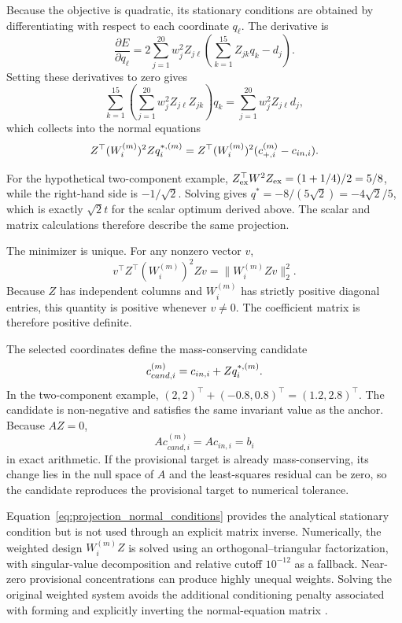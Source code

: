 Because the objective is quadratic, its stationary conditions are obtained by differentiating with respect to each coordinate $q_\ell$. The derivative is
\[
\frac{\partial E}{\partial q_\ell}
=2\sum_{j=1}^{20}w_j^2 Z_{j\ell}
\left(\sum_{k=1}^{15}Z_{jk}q_k-d_j\right).
\]
Setting these derivatives to zero gives
\[
\sum_{k=1}^{15}\left(\sum_{j=1}^{20}w_j^2Z_{j\ell}Z_{jk}\right)q_k
=\sum_{j=1}^{20}w_j^2Z_{j\ell}d_j,
\]
which collects into the normal equations
\begin{equation}
\equationname{Normal equations for weighted projection coordinates}
Z^\top(W_i^{(m)})^2Zq_i^{*,(m)}
=Z^\top(W_i^{(m)})^2(c_{+,i}^{(m)}-c_{in,i}).
\label{eq:projection_normal_conditions}
\end{equation}

For the hypothetical two-component example,
$Z_{\rm ex}^\top W^2Z_{\rm ex}=(1+1/4)/2=5/8$,
while the right-hand side is $-1/\sqrt2$. Solving gives
$q^*=-8/(5\sqrt2)=-4\sqrt2/5$, which is exactly $\sqrt2t$ for the scalar optimum derived above. The scalar and matrix calculations therefore describe the same projection.

The minimizer is unique. For any nonzero vector $v$,
\[
v^\top Z^\top(W_i^{(m)})^2Zv
=
\|W_i^{(m)}Zv\|_2^2.
\]
Because $Z$ has independent columns and $W_i^{(m)}$ has strictly positive diagonal entries, this quantity is positive whenever $v\neq0$. The coefficient matrix is therefore positive definite.

The selected coordinates define the mass-conserving candidate
\begin{equation}
\equationname{Component candidate satisfying mass conservation}
c_{cand,i}^{(m)}=c_{in,i}+Zq_i^{*,(m)}.
\label{eq:projection_conservative_candidate}
\end{equation}
In the two-component example,
$(2,2)^\top+(-0.8,0.8)^\top=(1.2,2.8)^\top$.
The candidate is non-negative and satisfies the same invariant value as the anchor. Because $AZ=0$,
\[
Ac_{cand,i}^{(m)}=Ac_{in,i}=b_i
\]
in exact arithmetic. If the provisional target is already mass-conserving, its change lies in the null space of $A$ and the least-squares residual can be zero, so the candidate reproduces the provisional target to numerical tolerance.

Equation~\eqref{eq:projection_normal_conditions} provides the analytical stationary condition but is not used through an explicit matrix inverse. Numerically, the weighted design $W_i^{(m)}Z$ is solved using an orthogonal--triangular factorization, with singular-value decomposition and relative cutoff $10^{-12}$ as a fallback. Near-zero provisional concentrations can produce highly unequal weights. Solving the original weighted system avoids the additional conditioning penalty associated with forming and explicitly inverting the normal-equation matrix \citep{BuzziFerraris2013}.

